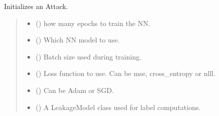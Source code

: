 \documentclass[letterpaper,10pt,english]{sphinxmanual}
\begin{document}
\begin{fulllineitems}
\begin{fulllineitems}
\pysigstopsignatures
\sphinxAtStartPar
Initializes an Attack.
\begin{quote}\begin{description}
\begin{itemize}
\item {} 
\sphinxAtStartPar
{} (\sphinxstyleliteralemphasis{\sphinxupquote{, }}) \textendash{} how many epochs to train the NN.

\item {} 
\sphinxAtStartPar
{} (\sphinxstyleliteralemphasis{\sphinxupquote{, }}) \textendash{} Which NN model to use.

\item {} 
\sphinxAtStartPar
{} (\sphinxstyleliteralemphasis{\sphinxupquote{, }}) \textendash{} Batch size used during training.

\item {} 
\sphinxAtStartPar
{} (\sphinxstyleliteralemphasis{\sphinxupquote{, }}) \textendash{} Loss function to use. Can be mse, cross\_entropy or nlll.

\item {} 
\sphinxAtStartPar
{} (\sphinxstyleliteralemphasis{\sphinxupquote{, }}) \textendash{} Can be Adam or SGD.

\item {} 
\sphinxAtStartPar
{} (\sphinxstyleliteralemphasis{\sphinxupquote{, }}\sphinxstyleliteralemphasis{\sphinxupquote{(}}\sphinxstyleliteralemphasis{\sphinxupquote{)}}) \textendash{} A LeakageModel class used for label computations.


\end{itemize}
\end{description}
\end{quote}
\end{fulllineitems}
\end{fulllineitems}
\end{document}
